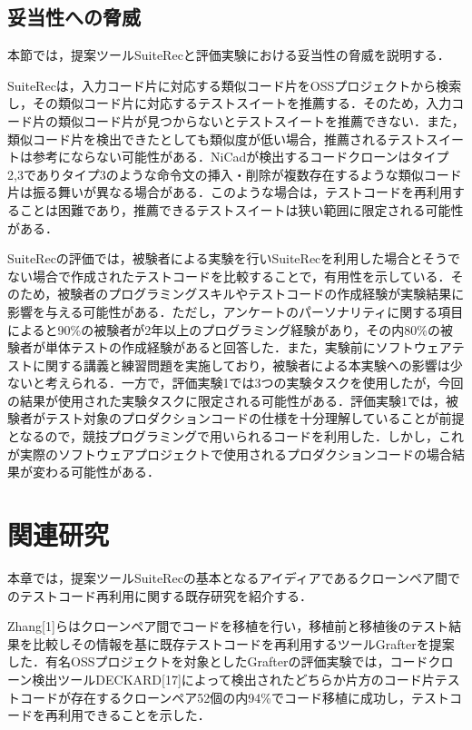 \documentclass[12pt]{jarticle} %
\begin{document}
\subsection{妥当性への脅威}

本節では，提案ツール{\sf SuiteRec}と評価実験における妥当性の脅威を説明する．

{\sf SuiteRec}は，入力コード片に対応する類似コード片をOSSプロジェクトから検索し，その類似コード片に対応するテストスイートを推薦する．そのため，入力コード片の類似コード片が見つからないとテストスイートを推薦できない．また，類似コード片を検出できたとしても類似度が低い場合，推薦されるテストスイートは参考にならない可能性がある．{\sf NiCad}が検出するコードクローンはタイプ2,3でありタイプ3のような命令文の挿入・削除が複数存在するような類似コード片は振る舞いが異なる場合がある．このような場合は，テストコードを再利用することは困難であり，推薦できるテストスイートは狭い範囲に限定される可能性がある．

{\sf SuiteRec}の評価では，被験者による実験を行い{\sf SuiteRec}を利用した場合とそうでない場合で作成されたテストコードを比較することで，有用性を示している．そのため，被験者のプログラミングスキルやテストコードの作成経験が実験結果に影響を与える可能性がある．ただし，アンケートのパーソナリティに関する項目によると90\%の被験者が2年以上のプログラミング経験があり，その内80\%の被験者が単体テストの作成経験があると回答した．また，実験前にソフトウェアテストに関する講義と練習問題を実施しており，被験者による本実験への影響は少ないと考えられる．一方で，評価実験1では3つの実験タスクを使用したが，今回の結果が使用された実験タスクに限定される可能性がある．評価実験1では，被験者がテスト対象のプロダクションコードの仕様を十分理解していることが前提となるので，競技プログラミングで用いられるコードを利用した．しかし，これが実際のソフトウェアプロジェクトで使用されるプロダクションコードの場合結果が変わる可能性がある．


\newpage
\section{関連研究}
本章では，提案ツール{\sf SuiteRec}の基本となるアイディアであるクローンペア間でのテストコード再利用に関する既存研究を紹介する．

Zhang[1]らはクローンペア間でコードを移植を行い，移植前と移植後のテスト結果を比較しその情報を基に既存テストコードを再利用するツール{\sf Grafter}を提案した．有名OSSプロジェクトを対象とした{\sf Grafter}の評価実験では，コードクローン検出ツール{\sf DECKARD}[17]によって検出されたどちらか片方のコード片テストコードが存在するクローンペア52個の内94\%でコード移植に成功し，テストコードを再利用できることを示した．
\end{document}
